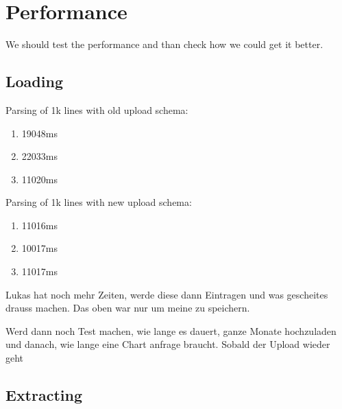 \section{Performance}
We should test the performance and than check how we could get it better.


\subsection{Loading}
Parsing of 1k lines with old upload schema:
\begin{enumerate}
  \item 19048ms
  \item 22033ms
  \item 11020ms
\end{enumerate}

Parsing of 1k lines with new upload schema:
\begin{enumerate}
  \item 11016ms
  \item 10017ms
  \item 11017ms
\end{enumerate}

Lukas hat noch mehr Zeiten, werde diese dann Eintragen und was gescheites drauss machen. Das oben war nur um meine zu speichern.

Werd dann noch Test machen, wie lange es dauert, ganze Monate hochzuladen
und danach, wie lange eine Chart anfrage braucht.
Sobald der Upload wieder geht

\subsection{Extracting}
